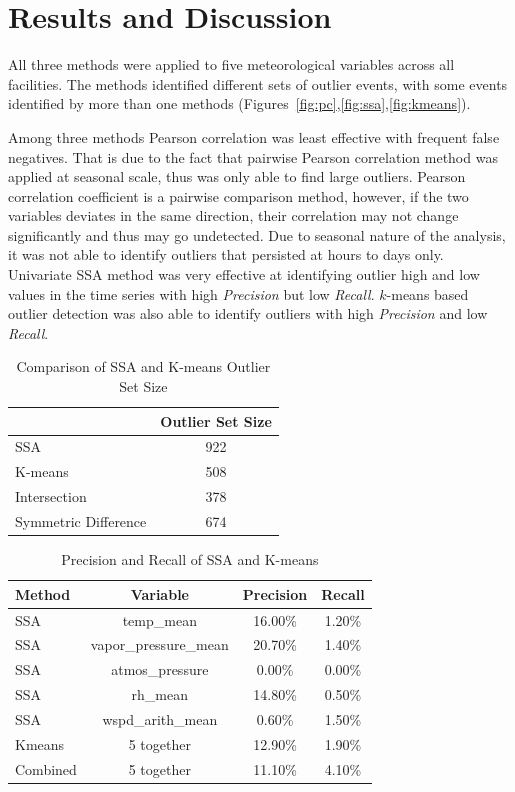 \section{Results and Discussion}
All three methods were applied to five meteorological variables across
all facilities. The methods identified different sets of outlier events,
with some events identified by more than one methods
(Figures~\ref{fig:pc},\ref{fig:ssa},\ref{fig:kmeans}).

Among three methods Pearson correlation was least effective with
frequent false negatives.
That is due to the fact that pairwise Pearson correlation method was 
applied at seasonal scale, thus was only able to find large outliers.
Pearson correlation coefficient is a pairwise comparison method, however, 
if the two variables deviates in the same direction, their correlation 
may not change significantly and thus may go undetected. Due to seasonal
nature of the analysis, it was not able to identify outliers that
persisted at hours to days only.
Univariate SSA method was very effective at identifying outlier high and
low values in the time series with high \textit{Precision} but low \textit{Recall}. 
$k$-means based outlier detection was also able to identify outliers
with high \textit{Precision} and low \textit{Recall}. 



\begin{table}[ht]
\caption{Comparison of SSA and K-means Outlier Set Size}
\label{tab:comp}
\centering
\begin{tabular}{|l|c|}
\cline{2-2}
\multicolumn{1}{l|}{} & Outlier Set Size\\
\hline
SSA & 922\\
K-means & 508\\
Intersection & 378\\
Symmetric Difference & 674\\
\hline
\end{tabular}
\end{table}

\begin{table}[ht]
\caption{Precision and Recall of SSA and K-means}
\label{tab:pr}
\centering
\begin{tabular}{|l|c|c|c|}
\hline
Method & Variable & Precision & Recall\\
\hline
SSA & temp\_mean & 16.00\% & 1.20\%\\
SSA & vapor\_pressure\_mean & 20.70\% & 1.40\%\\
SSA & atmos\_pressure & 0.00\% & 0.00\%\\
SSA & rh\_mean & 14.80\% & 0.50\%\\
SSA & wspd\_arith\_mean & 0.60\% & 1.50\%\\
Kmeans & 5 together & 12.90\% & 1.90\%\\
Combined & 5 together & 11.10\% & 4.10\%\\
\hline
\end{tabular}
\end{table}

